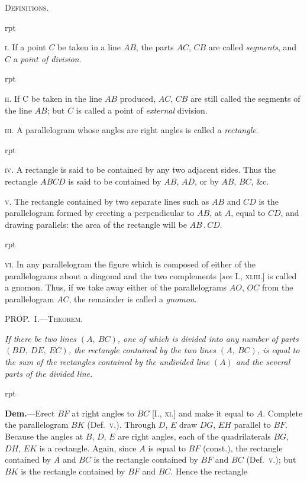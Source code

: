 \documentclass[oneside]{book}
\newcounter{wrapwidth}
\newcommand\mypropl[2]{
\bigskip\Needspace*{4\baselineskip}\begin{center}\textsc{#1}\end{center}
\hspace{\parindent}\emph{#2}\par\medskip
}
\newcommand\imgflow[3]{
\setcounter{wrapwidth}{#1}

\begin{wrapfigure}[#2]{r}{\value{wrapwidth}pt}
\begin{center}
\vspace{-0.3in}

\end{center}
\end{wrapfigure}
}
\newcommand\imgcent[2]{
\begin{center}

\end{center}
}
\begin{document}
\bigskip
\begin{center}
\textsc{Definitions.}
\end{center}


\imgflow{120}{2}{f072}

\textsc{i}. If a point $C$ be taken in a line $AB$, the parts $AC$,
$CB$ are called \emph{segments}, and $C$ a
\emph{point of division}.


\imgflow{140}{2}{f073}

\textsc{ii}. If C be taken in the line $AB$ produced, $AC$, $CB$ are
still called the segments of
the line $AB$; but $C$ is called
a point of \emph{external} division.

\textsc{iii}. A parallelogram whose angles are right angles is
called a \emph{rectangle}.


\imgflow{135}{8}{f074}

\textsc{iv}. A rectangle is said to
be contained by any two adjacent
sides. Thus the rectangle
$ABCD$ is said to be contained
by $AB$, $AD$, or by $AB$, $BC$,
\&c.


\textsc{v}. The rectangle contained by two separate lines
such as $AB$ and
$CD$ is the parallelogram
formed by erecting a perpendicular to $AB$, at
$A$, equal to $CD$, and drawing parallels: the area of the
rectangle will be $AB\,.\,CD$.


\imgcent{208}{f075}


\imgflow{140}{8}{f076}

\textsc{vi}. In any parallelogram the figure which is composed
of either of the parallelograms
about a diagonal
and the two complements
[\emph{see} I., \textsc{xliii}.] is called a
gnomon. Thus, if we take
away either of the parallelograms
$AO$, $OC$ from the
parallelogram $AC$, the remainder
is called a \emph{gnomon}.


\mypropl{PROP\@.~I.---Theorem.}{If there be two lines $(A,\ BC)$, one of which is divided
into any number of parts $(BD,\ DE,\ EC)$, the rectangle
contained by the two lines $(A,\ BC)$, is equal to the sum of
the rectangles contained by the undivided line $(A)$ and the
several parts of the divided line.}


\imgflow{185}{8}{f077}

\textbf{Dem.}---Erect $BF$ at right angles to $BC$ [I., \textsc{xi}.] and
make it equal to $A$. Complete the parallelogram $BK$
(Def.~\textsc{v}.). Through
$D$, $E$ draw $DG$, $EH$
parallel to $BF$. Because
the angles at
$B$, $D$, $E$ are right
angles, each of the
quadrilaterals $BG$,
$DH$, $EK$ is a rectangle.
Again, since $A$ is equal to $BF$ (const.), the
rectangle contained by $A$ and $BC$ is the rectangle contained
by $BF$ and $BC$ (Def.~\textsc{v}.); but $BK$ is the rectangle
contained by $BF$ and $BC$. Hence the rectangle
\end{document}

